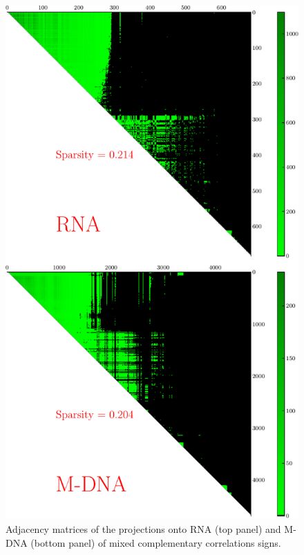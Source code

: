 \documentclass[10pt,a4paper]{article}
\begin{document}
\begin{figure}[h!]
\centering
\includegraphics[scale=0.4]{clustered-matrices-mixed.pdf}
\caption{\label{fig:matmixed}Adjacency matrices of the projections onto RNA (top panel) and M-DNA (bottom panel) of mixed complementary correlations signs.}
\end{figure}
\end{document}

